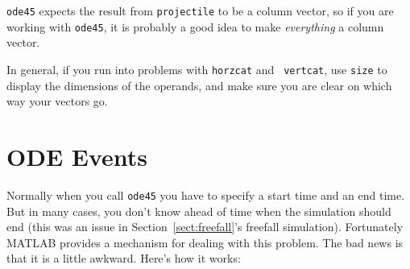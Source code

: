 \documentclass[
]{book}
\begin{document}
{\tt ode45} expects the result from {\tt projectile} to be a
column vector, so if you are working with {\tt ode45}, it is
probably a good idea to make {\em everything} a column vector.

In general, if you run into problems with {\tt horzcat} and {\tt
vertcat}, use {\tt size} to display the dimensions of the operands,
and make sure you are clear on which way your vectors go.


\section{ODE Events}
\label{sect:events}

Normally when you call {\tt ode45} you have to specify a start time and
an end time.  But in many cases, you don't know ahead of time when the
simulation should end (this was an issue in Section~\ref{sect:freefall}'s
freefall simulation). Fortunately MATLAB provides a mechanism for
dealing with this problem.  The bad news is that it is a little awkward.
Here's how it works:
\end{document}
